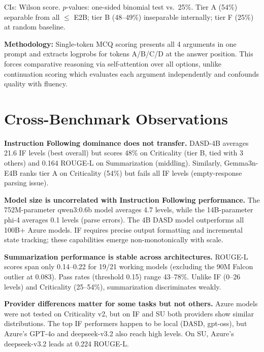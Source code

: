 \documentclass[11pt,a4paper]{article}
\begin{document}
CIs: Wilson score. $p$-values: one-sided binomial test vs.\ 25\%. Tier A (54\%) separable from all $\leq$ E2B; tier B (48--49\%) inseparable internally; tier F (25\%) at random baseline.

\textbf{Methodology:} Single-token MCQ scoring presents all 4 arguments in one prompt and extracts logprobs for tokens A/B/C/D at the answer position. This forces comparative reasoning via self-attention over all options, unlike continuation scoring which evaluates each argument independently and confounds quality with fluency.

\section{Cross-Benchmark Observations}

\textbf{Instruction Following dominance does not transfer.}
DASD-4B averages 21.6 IF levels (best overall) but scores 48\% on Criticality (tier B, tied with 3 others) and 0.164 ROUGE-L on Summarization (middling). Similarly, Gemma3n-E4B ranks tier A on Criticality (54\%) but fails all IF levels (empty-response parsing issue).

\textbf{Model size is uncorrelated with Instruction Following performance.}
The 752M-parameter qwen3:0.6b model averages 4.7 levels, while the 14B-parameter phi-4 averages 0.1 levels (parse errors). The 4B DASD model outperforms all 100B+ Azure models. IF requires precise output formatting and incremental state tracking; these capabilities emerge non-monotonically with scale.

\textbf{Summarization performance is stable across architectures.}
ROUGE-L scores span only 0.14--0.22 for 19/21 working models (excluding the 90M Falcon outlier at 0.083). Pass rates (threshold 0.15) range 43--78\%. Unlike IF (0--26 levels) and Criticality (25--54\%), summarization discriminates weakly.

\textbf{Provider differences matter for some tasks but not others.}
Azure models were not tested on Criticality v2, but on IF and SU both providers show similar distributions. The top IF performers happen to be local (DASD, gpt-oss), but Azure's GPT-4o and deepseek-v3.2 also reach high levels. On SU, Azure's deepseek-v3.2 leads at 0.224 ROUGE-L.
\end{document}
